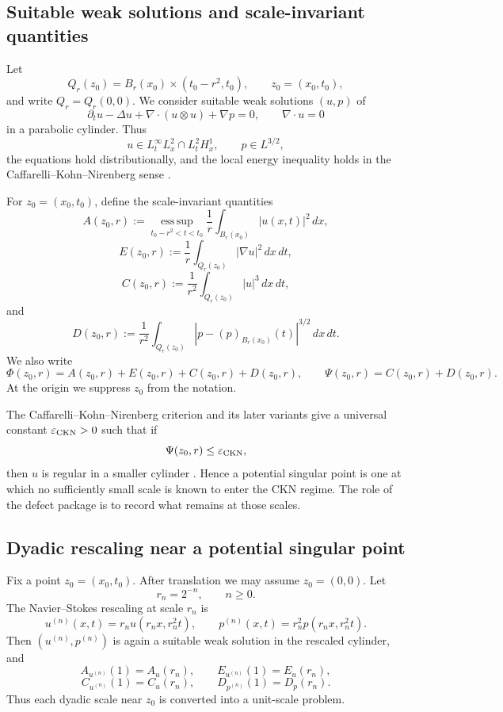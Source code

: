 \documentclass[11pt]{article}
\numberwithin{equation}{section}
\theoremstyle{plain}
\theoremstyle{definition}
\theoremstyle{remark}
\newcommand{\eps}{\varepsilon}
\newcommand{\esssup}{\operatorname*{ess\,sup}}
\begin{document}
\subsection{Suitable weak solutions and scale-invariant quantities}

Let
\[
  Q_r(z_0)=B_r(x_0)\times(t_0-r^2,t_0),
  \qquad z_0=(x_0,t_0),
\]
and write \(Q_r=Q_r(0,0)\).  We consider suitable weak solutions \((u,p)\) of
\begin{equation}
  \partial_t u-\Delta u+\nabla\cdot(u\otimes u)+\nabla p=0,
  \qquad
  \nabla\cdot u=0
  \label{eq:NS}
\end{equation}
in a parabolic cylinder.  Thus
\[
  u\in L_t^\infty L_x^2\cap L_t^2H_x^1,
  \qquad
  p\in L^{3/2},
\]
the equations hold distributionally, and the local energy inequality holds in the Caffarelli--Kohn--Nirenberg sense \cite{Leray1934,Hopf1951,Scheffer1976,CKN1982}.

For \(z_0=(x_0,t_0)\), define the scale-invariant quantities
\[
  A(z_0,r)
  :=
  \esssup_{t_0-r^2<t<t_0}
  \frac1r\int_{B_r(x_0)} |u(x,t)|^2\,dx,
\]
\[
  E(z_0,r)
  :=
  \frac1r\int_{Q_r(z_0)} |\nabla u|^2\,dx\,dt,
\]
\[
  C(z_0,r)
  :=
  \frac1{r^2}\int_{Q_r(z_0)} |u|^3\,dx\,dt,
\]
and
\[
  D(z_0,r)
  :=
  \frac1{r^2}\int_{Q_r(z_0)}
  |p-(p)_{B_r(x_0)}(t)|^{3/2}\,dx\,dt.
\]
We also write
\[
  \Phi(z_0,r)=A(z_0,r)+E(z_0,r)+C(z_0,r)+D(z_0,r),
  \qquad
  \Psi(z_0,r)=C(z_0,r)+D(z_0,r).
\]
At the origin we suppress \(z_0\) from the notation.

The Caffarelli--Kohn--Nirenberg criterion and its later variants give a universal constant \(\eps_{\rm CKN}>0\) such that if
\[
  \Psi(z_0,r)\le \eps_{\rm CKN},
\]
then \(u\) is regular in a smaller cylinder \cite{CKN1982,Lin1998,Vasseur2007,Seregin2007Local,GustafsonKangTsai2007,AlbrittonBarkerPrange2023}.  Hence a potential singular point is one at which no sufficiently small scale is known to enter the CKN regime.  The role of the defect package is to record what remains at those scales.

\subsection{Dyadic rescaling near a potential singular point}

Fix a point \(z_0=(x_0,t_0)\).  After translation we may assume \(z_0=(0,0)\).  Let
\[
  r_n=2^{-n},\qquad n\ge0.
\]
The Navier--Stokes rescaling at scale \(r_n\) is
\[
  u^{(n)}(x,t)=r_nu(r_nx,r_n^2t),
  \qquad
  p^{(n)}(x,t)=r_n^2p(r_nx,r_n^2t).
\]
Then \((u^{(n)},p^{(n)})\) is again a suitable weak solution in the rescaled cylinder, and
\[
  A_{u^{(n)}}(1)=A_u(r_n),
  \qquad
  E_{u^{(n)}}(1)=E_u(r_n),
\]
\[
  C_{u^{(n)}}(1)=C_u(r_n),
  \qquad
  D_{p^{(n)}}(1)=D_p(r_n).
\]
Thus each dyadic scale near \(z_0\) is converted into a unit-scale problem.
\end{document}
